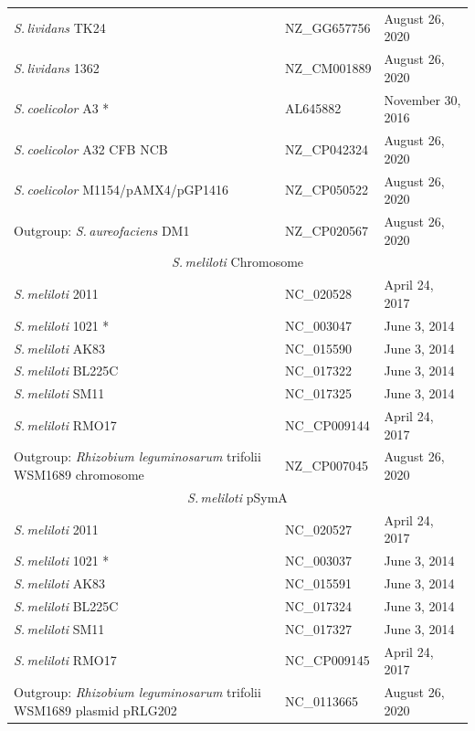 \documentclass[11pt]{article}
\newcommand{\smel}{\textit{S.\,meliloti}\xspace}
\newcommand{\agrot}{\textit{Agrobacterium tumefaciens}\xspace}
\newcommand{\sliv}{\textit{S.\,lividans}\xspace}
\newcommand{\scoe}{\textit{S.\,coelicolor}\xspace}
\newcommand{\saur}{\textit{S.\,aureofaciens}\xspace}
\newcommand{\rleg}{\textit{Rhizobium leguminosarum}\xspace}
\newcommand{\tub}{\textit{Mycobacterium tuberculosis}\xspace}
\begin{document}
\begin{table}[H]
{\begin{minipage}{\textwidth}
\begin{tabular}{lll}
				\midrule
				\sliv TK24 & NZ\_GG657756 & August 26, 2020\\
				\sliv 1362 & NZ\_CM001889 & August 26, 2020\\
				\scoe A3 * & AL645882 & November 30, 2016\\
				\scoe A32 CFB NCB & NZ\_CP042324 & August 26, 2020\\
				\scoe M1154/pAMX4/pGP1416 & NZ\_CP050522 & August 26, 2020\\
				Outgroup: \saur DM1 & NZ\_CP020567 & August 26, 2020\\	\midrule
				\multicolumn{3}{c}{\smel Chromosome}\\
				\midrule
				\smel 2011 & NC\_020528 & April 24, 2017\\
				\smel 1021 * & NC\_003047 & June 3, 2014\\
				\smel AK83 & NC\_015590 & June 3, 2014\\
				\smel BL225C & NC\_017322 & June 3, 2014\\
				\smel SM11 & NC\_017325 & June 3, 2014\\
				\smel RMO17 & NC\_CP009144 & April 24, 2017\\
				Outgroup: \rleg trifolii WSM1689 chromosome & NZ\_CP007045 & August 26, 2020\\
				\midrule
				\multicolumn{3}{c}{\smel pSymA} \\
				\midrule
				\smel 2011 & NC\_020527& April 24, 2017\\
				\smel 1021 * & NC\_003037 & June 3, 2014\\
				\smel AK83 & NC\_015591 & June 3, 2014\\
				\smel BL225C & NC\_017324 & June 3, 2014\\
				\smel SM11 & NC\_017327 & June 3, 2014\\
				\smel RMO17 & NC\_CP009145& April 24, 2017\\
				Outgroup: \rleg trifolii WSM1689 plasmid pRLG202 & NC\_0113665 & August 26, 2020\\

\end{tabular}
\end{minipage}}
\end{table}
\end{document}
